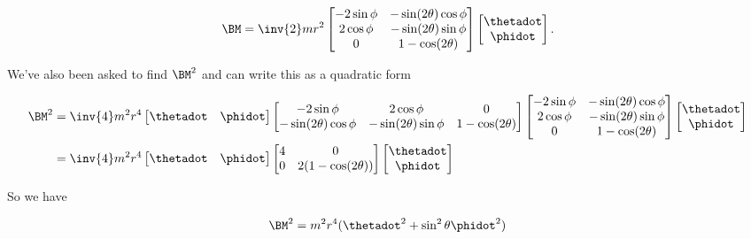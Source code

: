\begin{equation}\label{eqn:classicalMechanicsPs2:50}
\BM =
\inv{2} m r^2
\begin{bmatrix}
-  2 \sin\phi & - \sin(2\theta) \cos\phi \\
  2 \cos\phi & - \sin(2\theta) \sin\phi \\
0 & 1 - \cos(2\theta)
\end{bmatrix} 
\begin{bmatrix} 
\thetadot \\
\phidot
\end{bmatrix}.
\end{equation}

We've also been asked to find $\BM^2$ and can write this as a quadratic form

\begin{align*}
\BM^2 
&=
\inv{4} m^2 r^4
\begin{bmatrix} 
\thetadot & \phidot
\end{bmatrix}
\begin{bmatrix}
-  2 \sin\phi  & 2 \cos\phi  & 0 \\
- \sin(2\theta) \cos\phi & - \sin(2\theta) \sin\phi  & 1 - \cos(2\theta)
\end{bmatrix} 
\begin{bmatrix}
-  2 \sin\phi & - \sin(2\theta) \cos\phi \\
  2 \cos\phi & - \sin(2\theta) \sin\phi \\
0 & 1 - \cos(2\theta)
\end{bmatrix} 
\begin{bmatrix} 
\thetadot \\
\phidot
\end{bmatrix} \\
&=
\inv{4} m^2 r^4
\begin{bmatrix} 
\thetadot & \phidot
\end{bmatrix}
\begin{bmatrix} 
4 & 0 \\
0 & 2(1 - \cos(2\theta)) 
\end{bmatrix} 
\begin{bmatrix} 
\thetadot \\
\phidot
\end{bmatrix}  \\
\end{align*}

So we have

\begin{equation}\label{eqn:classicalMechanicsPs2:70}
\BM^2
=
m^2 r^4 ( \thetadot^2 + \sin^2\theta \phidot^2 )
\end{equation}

\EndNoBibArticle
